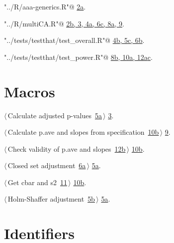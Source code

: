 \documentclass[reqno]{amsart}
\renewcommand{\NWlink}[2]{\hyperlink{#1}{#2}}
\begin{document}
{\small\begin{list}{}{\setlength{\itemsep}{-\parsep}\setlength{\itemindent}{-\leftmargin}}
\item \verb@"../R/aaa-generics.R"@ {\footnotesize {\NWtxtDefBy} \NWlink{nuweb2a}{2a}.}
\item \verb@"../R/multiCA.R"@ {\footnotesize {\NWtxtDefBy} \NWlink{nuweb2b}{2b}\NWlink{nuweb3}{, 3}\NWlink{nuweb4a}{, 4a}\NWlink{nuweb6c}{, 6c}\NWlink{nuweb8a}{, 8a}\NWlink{nuweb9}{, 9}.
}
\item \verb@"../tests/testthat/test_overall.R"@ {\footnotesize {\NWtxtDefBy} \NWlink{nuweb4b}{4b}\NWlink{nuweb5c}{, 5c}\NWlink{nuweb6b}{, 6b}.
}
\item \verb@"../tests/testthat/test_power.R"@ {\footnotesize {\NWtxtDefBy} \NWlink{nuweb8b}{8b}\NWlink{nuweb10a}{, 10a}\NWlink{nuweb12a}{, 12a}\NWlink{nuweb12c}{c}.
}
\end{list}}

\section{Macros}


{\small\begin{list}{}{\setlength{\itemsep}{-\parsep}\setlength{\itemindent}{-\leftmargin}}
\item $\langle\,$Calculate adjusted p-values\nobreak\ {\footnotesize \NWlink{nuweb5a}{5a}}$\,\rangle$ {\footnotesize {\NWtxtRefIn} \NWlink{nuweb3}{3}.}
\item $\langle\,$Calculate p.ave and slopes from specification\nobreak\ {\footnotesize \NWlink{nuweb10b}{10b}}$\,\rangle$ {\footnotesize {\NWtxtRefIn} \NWlink{nuweb9}{9}.}
\item $\langle\,$Check validity of p.ave and slopes\nobreak\ {\footnotesize \NWlink{nuweb12b}{12b}}$\,\rangle$ {\footnotesize {\NWtxtRefIn} \NWlink{nuweb10b}{10b}.}
\item $\langle\,$Closed set adjustment\nobreak\ {\footnotesize \NWlink{nuweb6a}{6a}}$\,\rangle$ {\footnotesize {\NWtxtRefIn} \NWlink{nuweb5a}{5a}.}
\item $\langle\,$Get cbar and s2\nobreak\ {\footnotesize \NWlink{nuweb11}{11}}$\,\rangle$ {\footnotesize {\NWtxtRefIn} \NWlink{nuweb10b}{10b}.}
\item $\langle\,$Holm-Shaffer adjustment\nobreak\ {\footnotesize \NWlink{nuweb5b}{5b}}$\,\rangle$ {\footnotesize {\NWtxtRefIn} \NWlink{nuweb5a}{5a}.}
\end{list}}

\section{Identifiers}
\end{document}
